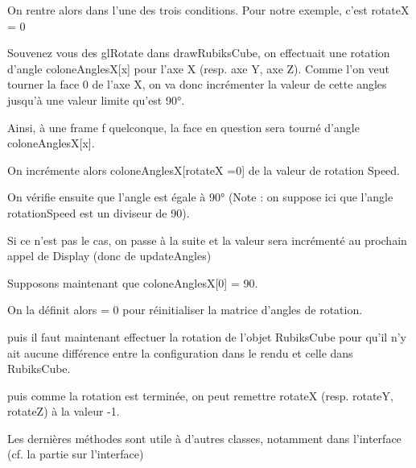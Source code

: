 On rentre alors dans l’une des trois conditions. Pour notre exemple, c’est rotateX = 0

Souvenez vous des glRotate dans drawRubiksCube, on effectuait une rotation d’angle coloneAnglesX[x] pour l’axe X (resp. axe Y, axe Z). Comme l’on veut tourner la face 0 de l’axe X, on va donc incrémenter la valeur de cette angles jusqu’à une valeur limite qu’est 90°.

Ainsi, à une frame f quelconque, la face en question sera tourné d’angle coloneAnglesX[x].

On incrémente alors coloneAnglesX[rotateX =0] de la valeur de rotation Speed.

On vérifie ensuite que l’angle est égale à 90° (Note : on suppose ici que l’angle rotationSpeed est un diviseur de 90).

Si ce n’est pas le cas, on passe à la suite et la valeur sera incrémenté au prochain appel de Display (donc de updateAngles)

Supposons maintenant que coloneAnglesX[0] = 90.

On la définit alors = 0 pour réinitialiser la matrice d’angles de rotation.

puis il faut maintenant effectuer la rotation de l’objet RubiksCube pour qu’il n’y ait aucune différence entre la configuration dans le rendu et celle dans RubiksCube.

puis comme la rotation est terminée, on peut remettre rotateX (resp. rotateY, rotateZ)  à la valeur -1.

Les dernières méthodes sont utile à d’autres classes, notamment dans l’interface (cf. la partie sur l'interface)

